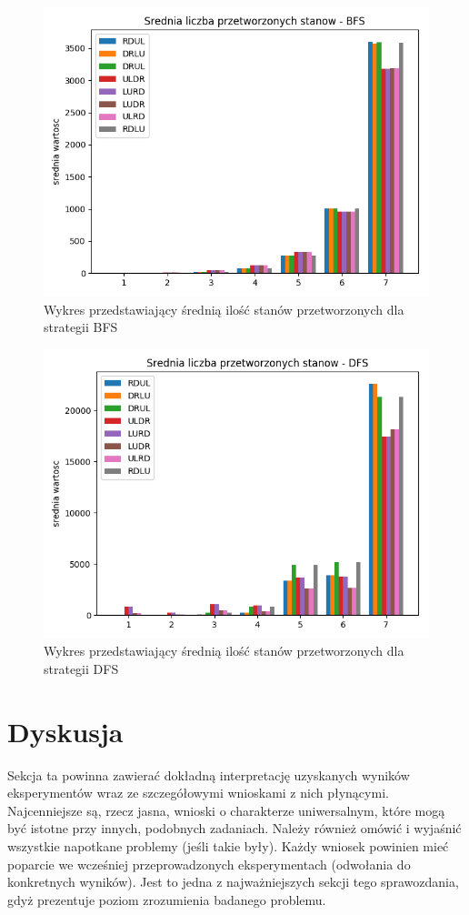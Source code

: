 \documentclass{classrep}
\begin{document}
{\begin{figure}
\includegraphics [scale=0.5]{przetworzone_BFS}
\caption{Wykres przedstawiający średnią ilość stanów przetworzonych dla strategii BFS}
\end{figure}
\begin{figure}
\centering
\includegraphics [scale=0.5]{przetworzone_DFS}
\caption{Wykres przedstawiający średnią ilość stanów przetworzonych dla strategii DFS}
\end{figure}
}
\newpage
\section{Dyskusja}
{\color{blue}
Sekcja ta powinna zawierać dokładną interpretację uzyskanych wyników
eksperymentów wraz ze szczegółowymi wnioskami z nich płynącymi. Najcenniejsze
są, rzecz jasna, wnioski o charakterze uniwersalnym, które mogą być istotne
przy innych, podobnych zadaniach. Należy również omówić i wyjaśnić wszystkie
napotkane problemy (jeśli takie były). Każdy wniosek powinien mieć poparcie we
wcześniej przeprowadzonych eksperymentach (odwołania do konkretnych wyników).
Jest to jedna z najważniejszych sekcji tego sprawozdania, gdyż prezentuje
poziom zrozumienia badanego problemu.}
\end{document}
